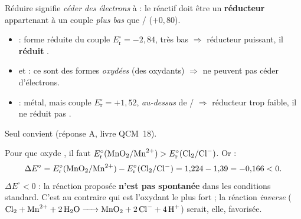 \documentclass[11pt,a4paper]{article}
\newcommand{\Ered}{\ensuremath{E_{\mathrm{r}}^{\circ}}}
\begin{document}
\begin{corr}
\og{}Réduire \fg{} signifie \emph{céder des électrons} à  : le réactif doit être un
\textbf{réducteur} appartenant à un couple \emph{plus bas} que / ($+0{,}80$).
\begin{itemize}[leftmargin=1.5em,topsep=1pt,itemsep=1pt]
  \item \textbf{} : forme réduite du couple $\Ered=-2{,}84$, très bas $\Rightarrow$ réducteur puissant,
        il \textbf{réduit }. \checkmark
  \item {} et  : ce sont des formes \emph{oxydées} (des oxydants) $\Rightarrow$ ne peuvent
        pas céder d'électrons.
  \item {} : métal, mais couple $\Ered=+1{,}52$, \emph{au-dessus} de / $\Rightarrow$
        réducteur trop faible, il ne réduit pas .
\end{itemize}
Seul \textbf{} convient (réponse A, livre QCM~18).
\end{corr}

\begin{corr}
Pour que  oxyde , il faut $\Ered(\ce{MnO2}/\ce{Mn^{2+}}) > \Ered(\ce{Cl2}/\ce{Cl^-})$.
Or :
\[
\Delta E^{\circ} = \Ered(\ce{MnO2}/\ce{Mn^{2+}}) - \Ered(\ce{Cl2}/\ce{Cl^-}) = 1{,}224 - 1{,}39 = -0{,}166 < 0.
\]
$\Delta E^{\circ}<0$ : la réaction proposée \textbf{n'est pas spontanée} dans les conditions standard.
C'est au contraire  qui est l'oxydant le plus fort ; la réaction \emph{inverse}
($\ce{Cl2 + Mn^{2+} + 2 H2O -> MnO2 + 2 Cl^- + 4 H+}$) serait, elle, favorisée.
\end{corr}
\end{document}
